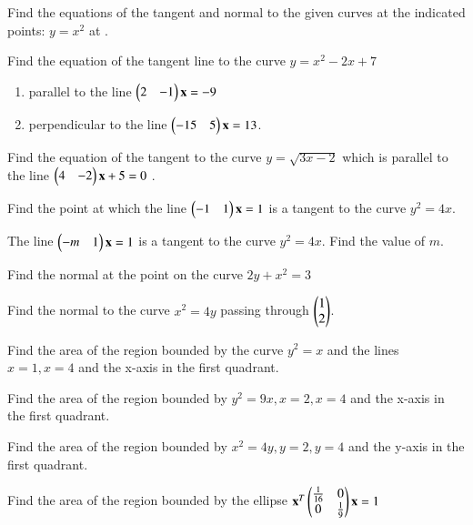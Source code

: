 \item Find the equations of the tangent and normal to the given curves at the indicated points:
$
y = x^2
$
at .
\item Find the equation of the tangent line to the curve $y = x^2-2x+7$
\begin{enumerate}
%
\item  parallel to the line $\begin{pmatrix}2 & -1\end{pmatrix}\mathbf{x}= -9$ 
\item  perpendicular to the line $\begin{pmatrix}-15 & 5\end{pmatrix}\mathbf{x} = 13$. 
\end{enumerate}
\item Find the equation of the tangent to the curve $y = \sqrt{3x - 2}$ which is parallel to the line $\begin{pmatrix}4 & -2\end{pmatrix}\mathbf{x}+ 5 =0$ .
%
\solution


\item Find the point at which the line $\begin{pmatrix}-1 & 1\end{pmatrix}\mathbf{x} =  1$ is a tangent to the curve $y^2 = 4x$.
%
\item The line $\begin{pmatrix}-m & 1\end{pmatrix}\mathbf{x} = 1$ is a tangent to the curve $y^2 = 4x$.  Find the value of $m$.
\item  Find the normal at the point  on the curve $2y + x^2 = 3$ 
\item  Find the normal to the curve $x^2=4y$ passing through $\begin{pmatrix}1\\2\end{pmatrix}$.
%
\item Find the area of the region bounded by the curve $y^2= x$ and the lines $x = 1, x = 4$ and the x-axis in the first quadrant.
\item  Find the area of the region bounded by $y^2=9x, x=2, x=4$ and the x-axis in the  first quadrant.
%
\item Find the area of the region bounded by $x^2 = 4y, y = 2, y = 4$ and the y-axis in the first quadrant.
\item Find the area of the region bounded by the ellipse 
$
\mathbf{x}^T\begin{pmatrix}\frac{1}{16} & 0 \\ 0 & \frac{1}{9}\end{pmatrix}\mathbf{x} = 1
$

